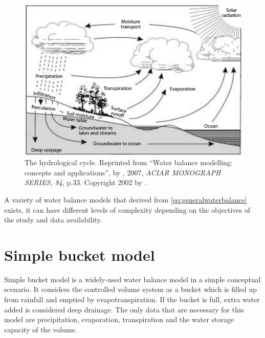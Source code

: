 \begin{figure}[bth]
\begin{center}
\includegraphics[width=.85\linewidth]{gfx/hydrocycle}
\end{center}
\caption{The hydrological cycle\citep{Zhang2002}. Reprinted from ``Water balance modelling: concepts and applications'', by \citeauthor{Zhang2002}, 2007, \emph{ACIAR MONOGRAPH SERIES, 84}, p.33. Copyright 2002 by \citeauthor{Zhang2002}.  }
\label{fig:hydrocycle}
\end{figure}
\newline
A variety of water balance models that derived from \autoref{eq:generalwaterbalance} exists, it can have different levels of complexity depending on the objectives of the study and data availability. 
\section{Simple bucket model}
Simple bucket model is a widely-used water balance model in a simple conceptual scenario. It considers the controlled volume system as a bucket which is filled up from rainfall and emptied by evapotranspiration. If the bucket is full, extra water added is considered deep drainage. The only data that are necessary for this model are precipitation, evaporation, transpiration and the water storage capacity of the volume. 
